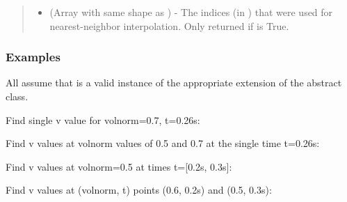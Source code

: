 \documentclass[letterpaper,10pt,english]{sphinxmanual}
\begin{document}
\begin{fulllineitems}
\begin{fulllineitems}
\begin{quote}
\begin{description}
\begin{itemize}
\item {} 
 (Array with same shape as ) - The indices
(in ) that were used for
nearest-neighbor interpolation. Only returned if  is
True.

\end{itemize}


\end{description}\end{quote}
\subsubsection*{Examples}

All assume that  is a valid instance of the appropriate
extension of the {\hyperref[\detokenize{eqtools:eqtools.core.Equilibrium}]{}} abstract class.

Find single v value for volnorm=0.7, t=0.26s:

\begin{sphinxVerbatim}[commandchars=\\\{\}]
   
\end{sphinxVerbatim}

Find v values at volnorm values of 0.5 and 0.7 at the single time
t=0.26s:

\begin{sphinxVerbatim}[commandchars=\\\{\}]
  \PYG{p}{[} \PYG{p}{]} 
\end{sphinxVerbatim}

Find v values at volnorm=0.5 at times t={[}0.2s, 0.3s{]}:

\begin{sphinxVerbatim}[commandchars=\\\{\}]
   \PYG{p}{[} \PYG{p}{]}
\end{sphinxVerbatim}

Find v values at (volnorm, t) points (0.6, 0.2s) and (0.5, 0.3s):


\end{fulllineitems}
\end{fulllineitems}
\end{document}

